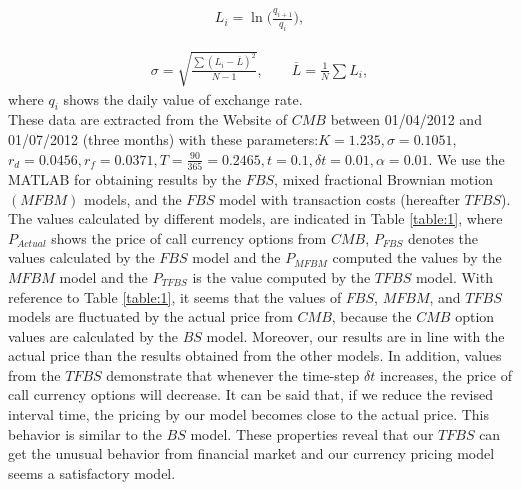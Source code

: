 \documentclass[a4paper,11pt]{amsart}
\numberwithin{equation}{section}
\theoremstyle{definition}
\theoremstyle{plain}
\theoremstyle{definition}
\newcommand{\1}{\mathbf{1}}
\begin{document}
\begin{eqnarray}
L_i=\ln\Big(\frac{q_{i+1}}{q_i}\Big),
\label{eq:25}
\end{eqnarray}

\begin{eqnarray}
\sigma=\sqrt{\frac{\sum(L_i-\overline{L})^2}{N-1}},\qquad\overline{L}=\frac{1}{N}\sum L_i,
\label{eq:26}
\end{eqnarray}
where $q_i$ shows the daily value of exchange rate.\\


These data are extracted from  the Website of $CMB$ between 01/04/2012 and 01/07/2012 (three months) with these parameters:$K=1.235, \sigma=0.1051,$ $r_d=0.0456, r_f=0.0371, T=\frac{90}{365}=0.2465, t=0.1, \delta t=0.01, \alpha=0.01$. We use the MATLAB for obtaining results by the $FBS$, mixed fractional Brownian motion $(MFBM)$ models, and the $FBS$ model with transaction costs (hereafter $TFBS$). The values calculated by different models, are indicated in Table \ref{table:1}, where $P_{Actual}$ shows the price of call currency options from $CMB$, $P_{FBS}$ denotes the values calculated by the $FBS$ model and the $P_{MFBM}$ computed the values by the $MFBM$ model and the $P_{TFBS}$ is the value computed by the $TFBS$ model. With reference to Table \ref{table:1}, it seems that the values of $FBS$, $MFBM$, and $TFBS$ models are fluctuated by the actual price from $CMB$, because the $CMB$ option values are calculated by the $BS$ model. Moreover, our results are in line with the actual price than the results obtained from the other models. In addition, values from the $TFBS$ demonstrate that whenever the time-step $\delta t$ increases, the price of call currency options will decrease. It can be said that, if we reduce the revised interval time, the pricing by our model becomes close to the actual price. This behavior is similar to the $BS$ model. These properties reveal that our $TFBS$ can get the unusual behavior from financial market and our currency pricing model seems a satisfactory model.
\end{document}
